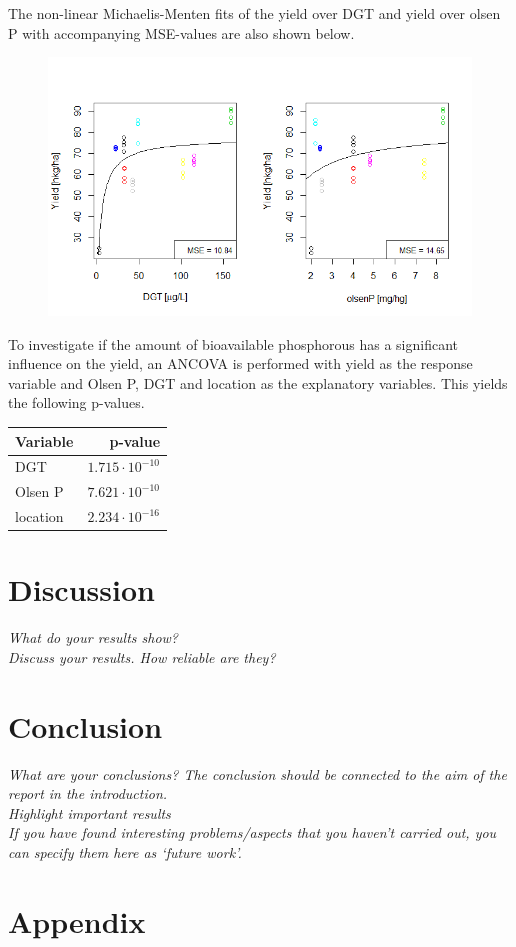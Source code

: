 \documentclass[11pt, fleqn, titlepage]{article}
\begin{document}
\noindent The non-linear Michaelis-Menten fits of the yield over DGT and yield over olsen P with accompanying MSE-values are also shown below.

\begin{figure}[H]
	\centering
	\includegraphics[width=0.7\linewidth]{billeder/non-linearfit.png}
	\caption{}
	\label{fig:non-linearfit}
\end{figure}

\noindent To investigate if the amount of bioavailable phosphorous has a significant influence on the yield, an ANCOVA is performed with yield as the response variable and Olsen P, DGT and location as the explanatory variables. This yields the following p-values.

\begin{table}[H]
	\centering
	\begin{tabular}{l r}
		\toprule
		Variable     & p-value                       \\ \midrule
		DGT          & $1.715 \cdot 10^{-10}$       \\ 
		Olsen P      & $7.621 \cdot 10^{-10}$         \\ 
		location     & $2.234 \cdot 10^{-16}$       \\ \bottomrule 
	\end{tabular}
\end{table}

\section{Discussion}
\textit{What do your results show? \\ Discuss your results. How reliable are they?}

\section{Conclusion}
\textit{What are your conclusions? The conclusion should be connected to the aim of the report in the introduction. \\ Highlight important results \\ If you have found interesting problems/aspects that you haven’t carried out, you can specify them here as ‘future work’.}

\section{Appendix}
\end{document}
